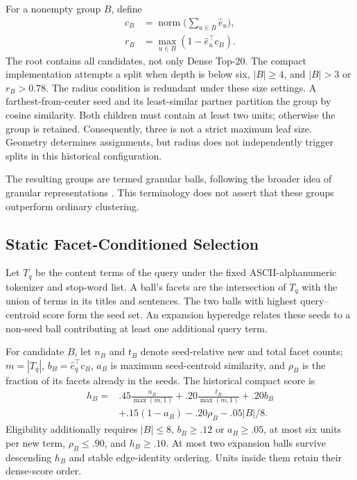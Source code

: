 \documentclass[11pt]{article}
\begin{document}
For a nonempty group $B$, define
\begin{equation}
\begin{aligned}
c_B&=\operatorname{norm}\Big(\sum_{u\in B}\hat e_u\Big),\\
r_B&=\max_{u\in B}(1-\hat e_u^\top c_B).
\end{aligned}
\end{equation}
The root contains all candidates, not only Dense Top-20. The compact
implementation attempts a split when depth is below six, $|B|\geq4$, and
$|B|>3$ or $r_B>0.78$. The radius condition is redundant under these size
settings. A farthest-from-center seed and its least-similar partner partition
the group by cosine similarity. Both children must contain at least two units;
otherwise the group is retained. Consequently, three is not a strict maximum
leaf size. Geometry determines assignments, but radius does not independently
trigger splits in this historical configuration.

The resulting groups are termed granular balls, following the broader idea of
granular representations \citep{xia2019granularball}. This terminology does not
assert that these groups outperform ordinary clustering.

\subsection{Static Facet-Conditioned Selection}
Let $T_q$ be the content terms of the query under the fixed ASCII-alphanumeric
tokenizer and stop-word list. A ball's facets are the intersection of $T_q$
with the union of terms in its titles and sentences. The two balls with highest
query--centroid score form the seed set. An expansion hyperedge relates these
seeds to a non-seed ball contributing at least one additional query term.

For candidate $B$, let $n_B$ and $t_B$ denote seed-relative new and total facet
counts; $m=|T_q|$, $b_B=\hat e_q^\top c_B$, $a_B$ is maximum seed-centroid
similarity, and $\rho_B$ is the fraction of its facets already in the seeds.
The historical compact score is
\begin{equation}
\begin{split}
h_B={}&.45\frac{n_B}{\max(m,1)}+.20\frac{t_B}{\max(m,1)}
       +.20b_B\\
     &+.15(1-a_B)-.20\rho_B-.05|B|/8 .
\end{split}\label{eq:score}
\end{equation}
Eligibility additionally requires $|B|\leq8$, $b_B\geq.12$ or $a_B\geq.05$,
at most six units per new term, $\rho_B\leq.90$, and $h_B\geq.10$.
At most two expansion balls survive descending $h_B$ and stable edge-identity
ordering. Units inside them retain their dense-score order.
\end{document}
